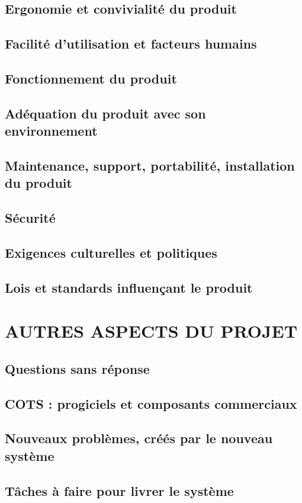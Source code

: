 \documentclass[a4]{article}
\begin{document}
		\subsection{Ergonomie et convivialité du produit}
		\subsection{Facilité d’utilisation et facteurs humains}
		\subsection{Fonctionnement du produit}
		\subsection{Adéquation du produit avec son environnement}
		\subsection{Maintenance, support, portabilité, installation du produit}
		\subsection{Sécurité}
		\subsection{Exigences culturelles et politiques}
		\subsection{Lois et standards influençant le produit}
	\section{AUTRES ASPECTS DU PROJET}
		\subsection{Questions sans réponse}
		\subsection{COTS : progiciels et composants commerciaux}
		\subsection{Nouveaux problèmes, créés par le nouveau système}
		\subsection{Tâches à faire pour livrer le système}
\end{document}
